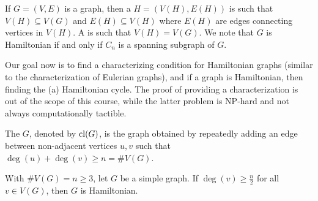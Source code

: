 If $G = (V,E)$ is a graph, then a  $H = (V(H),E(H))$ is such that $V(H) \subseteq V(G)$ and $E(H) \subseteq V(H)$ where $E(H)$ are edges connecting vertices in $V(H)$. A  is such that $V(H) = V(G)$. We note that $G$ is Hamiltonian if and only if $C_{n}$ is a spanning subgraph of $G$.

Our goal now is to find a characterizing condition for Hamiltonian graphs (similar to the characterization of Eulerian graphs), and if a graph is Hamiltonian, then finding the (a) Hamiltonian cycle. The proof of providing a characterization is out of the scope of this course, while the latter problem is NP-hard and not always computationally tactible.


\begin{definition}
    The  $G$, denoted by $\operatorname{cl}(G)$, is the graph obtained by repeatedly adding an edge between non-adjacent vertices $u,v$ such that $\deg(u)+\deg(v) \geq n = \#V(G)$.
\end{definition}

\begin{proposition}
    With $\#V(G) = n \geq 3$, let $G$ be a simple graph. If $\deg(v) \geq \frac{n}{2}$ for all $v \in V(G)$, then $G$ is Hamiltonian.
\end{proposition}

